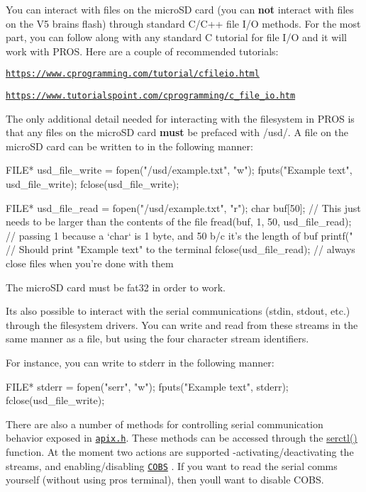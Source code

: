 You can interact with files on the micro\+SD card (you can {\bfseries not} interact with files on the V5 brain\textquotesingle{}s flash) through standard C/\+C++ file I/O methods. For the most part, you can follow along with any standard C tutorial for file I/O and it will work with P\+R\+OS. Here are a couple of recommended tutorials\+:


\begin{DoxyItemize}
\item \href{https://www.cprogramming.com/tutorial/cfileio.html}{\tt https\+://www.\+cprogramming.\+com/tutorial/cfileio.\+html}
\item \href{https://www.tutorialspoint.com/cprogramming/c_file_io.htm}{\tt https\+://www.\+tutorialspoint.\+com/cprogramming/c\+\_\+file\+\_\+io.\+htm}
\end{DoxyItemize}

The only additional detail needed for interacting with the filesystem in P\+R\+OS is that any files on the micro\+SD card {\bfseries must} be prefaced with {\ttfamily /usd/}. A file on the micro\+SD card can be written to in the following manner\+:


\begin{DoxyCode}
FILE* usd\_file\_write = fopen("/usd/example.txt", "w");
fputs("Example text", usd\_file\_write);
fclose(usd\_file\_write);

FILE* usd\_file\_read = fopen("/usd/example.txt", "r");
char buf[50]; // This just needs to be larger than the contents of the file
fread(buf, 1, 50, usd\_file\_read); // passing 1 because a `char` is 1 byte, and 50 b/c it's the length of
       buf
printf("%
// Should print "Example text" to the terminal
fclose(usd\_file\_read); // always close files when you're done with them
\end{DoxyCode}


The micro\+SD card must be fat32 in order to work.

It\textquotesingle{}s also possible to interact with the serial communications ({\ttfamily stdin}, {\ttfamily stdout}, etc.) through the filesystem drivers. You can write and read from these streams in the same manner as a file, but using the four character stream identifiers.

For instance, you can write to {\ttfamily stderr} in the following manner\+:


\begin{DoxyCode}
FILE* stderr = fopen("serr", "w");
fputs("Example text", stderr);
fclose(usd\_file\_write);
\end{DoxyCode}


There are also a number of methods for controlling serial communication behavior exposed in \href{../../extended/apix.html}{\tt apix.\+h}. These methods can be accessed through the {\ttfamily \hyperlink{apix_8h_a962daefd6f45a8def6ff00802a23fbff}{serctl()}} function. At the moment two actions are supported -\/activating/deactivating the streams, and enabling/disabling \href{https://en.wikipedia.org/wiki/Consistent_Overhead_Byte_Stuffing}{\tt C\+O\+BS} . If you want to read the serial comms yourself (without using {\ttfamily pros terminal}), then you\textquotesingle{}ll want to disable C\+O\+BS. 